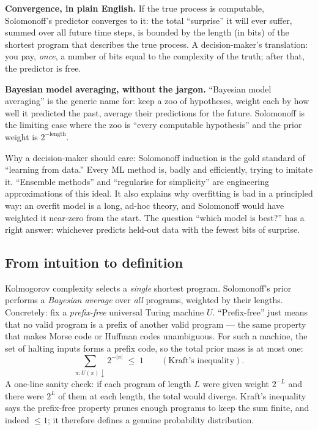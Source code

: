 \documentclass[12pt,a4paper]{article}
\theoremstyle{plain}
\theoremstyle{definition}
\begin{document}
\begin{intuition}
\textbf{Convergence, in plain English.}  If the true process is
computable, Solomonoff's predictor converges to it: the total
``surprise'' it will ever suffer, summed over all future time steps,
is bounded by the length (in bits) of the shortest program that
describes the true process.  A decision-maker's translation: you pay,
\emph{once}, a number of bits equal to the complexity of the truth;
after that, the predictor is free.

\textbf{Bayesian model averaging, without the jargon.}  ``Bayesian
model averaging'' is the generic name for: keep a zoo of hypotheses,
weight each by how well it predicted the past, average their
predictions for the future.  Solomonoff is the limiting case where
the zoo is ``every computable hypothesis'' and the prior weight is
$2^{-\text{length}}$.

Why a decision-maker should care: Solomonoff induction is the gold
standard of ``learning from data.''  Every ML method is, badly and
efficiently, trying to imitate it.  ``Ensemble methods'' and
``regularise for simplicity'' are engineering approximations of this
ideal.  It also explains why overfitting is bad in a principled way:
an overfit model is a long, ad-hoc theory, and Solomonoff would have
weighted it near-zero from the start.  The question ``which model is
best?'' has a right answer: whichever predicts held-out data with the
fewest bits of surprise.
\end{intuition}

\subsection*{From intuition to definition}

Kolmogorov complexity selects a \emph{single} shortest program.
Solomonoff's prior \citep{solomonoff1964formal} performs a
\emph{Bayesian average} over \emph{all} programs, weighted by their
lengths.  Concretely: fix a \emph{prefix-free} universal Turing
machine $U$.  ``Prefix-free'' just means that no valid program is a
prefix of another valid program --- the same property that makes
Morse code or Huffman codes unambiguous.  For such a machine, the
set of halting inputs forms a prefix code, so the total prior mass
is at most one:
\[
  \sum_{\pi : U(\pi)\downarrow} 2^{-|\pi|} \;\le\; 1
  \qquad(\text{Kraft's inequality}).
\]
A one-line sanity check: if each program of length $L$ were given
weight $2^{-L}$ and there were $2^L$ of them at each length,
the total would diverge.  Kraft's inequality says the prefix-free
property prunes enough programs to keep the sum finite, and indeed
$\le 1$; it therefore defines a genuine probability distribution.
\end{document}
